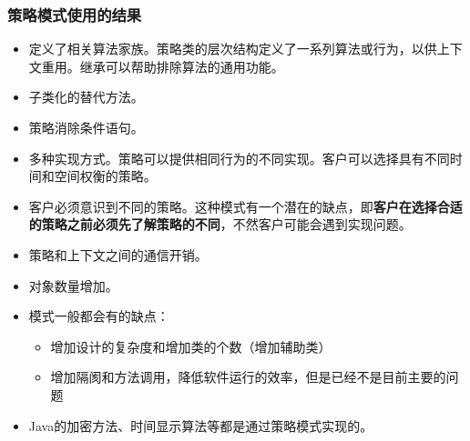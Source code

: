 \subsubsection{策略模式使用的结果}
\begin{itemize}
    \item 定义了相关算法家族。策略类的层次结构定义了一系列算法或行为，以供上下文重用。继承可以帮助排除算法的通用功能。
    \item 子类化的替代方法。
    \item 策略消除条件语句。
    \item 多种实现方式。策略可以提供相同行为的不同实现。客户可以选择具有不同时间和空间权衡的策略。
    \item 客户必须意识到不同的策略。这种模式有一个潜在的缺点，即\textbf{客户在选择合适的策略之前必须先了解策略的不同}，不然客户可能会遇到实现问题。
    \item 策略和上下文之间的通信开销。
    \item 对象数量增加。
    \item  模式一般都会有的缺点：
    \begin{itemize}
        \item 增加设计的复杂度和增加类的个数（增加辅助类）
        \item 增加隔阂和方法调用，降低软件运行的效率，但是已经不是目前主要的问题
    \end{itemize}
    \item Java的加密方法、时间显示算法等都是通过策略模式实现的。
\end{itemize}